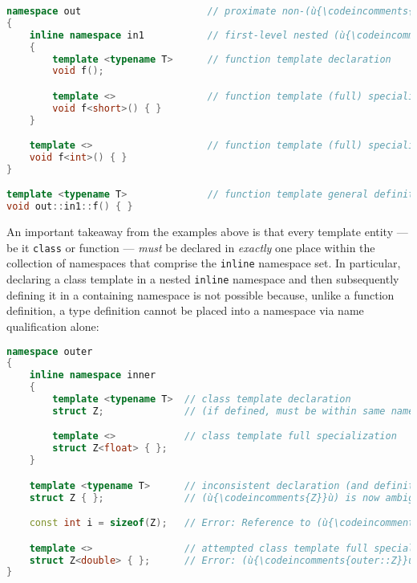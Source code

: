 \begin{lstlisting}[language=C++]
namespace out                      // proximate non-(ù{\codeincomments{inline}}ù) outer namespace
{
    inline namespace in1           // first-level nested (ù{\codeincomments{inline}}ù) namespace
    {
        template <typename T>      // function template declaration
        void f();

        template <>                // function template (full) specialization
        void f<short>() { }
    }

    template <>                    // function template (full) specialization
    void f<int>() { }
}

template <typename T>              // function template general definition
void out::in1::f() { }
\end{lstlisting}
    
\noindent An important takeaway from the examples above is that every template
entity --- be it \texttt{class} or function --- \emph{must} be declared
in \emph{exactly} one place within the collection of namespaces that
comprise the \texttt{inline} namespace set. In particular, declaring a
class template in a nested \texttt{inline} namespace and then
subsequently defining it in a containing namespace is not possible
because, unlike a function definition, a type definition cannot be
placed into a namespace via name qualification alone:

\begin{lstlisting}[language=C++]
namespace outer
{
    inline namespace inner
    {
        template <typename T>  // class template declaration
        struct Z;              // (if defined, must be within same namespace)

        template <>            // class template full specialization
        struct Z<float> { };
    }

    template <typename T>      // inconsistent declaration (and definition)
    struct Z { };              // (ù{\codeincomments{Z}}ù) is now ambiguous in namespace (ù{\codeincomments{outer}}ù).

    const int i = sizeof(Z);   // Error: Reference to (ù{\codeincomments{Z}}ù) is ambiguous.

    template <>                // attempted class template full specialization
    struct Z<double> { };      // Error: (ù{\codeincomments{outer::Z}}ù) or (ù{\codeincomments{outer::inner::Z}}ù)?
}
\end{lstlisting}
    


